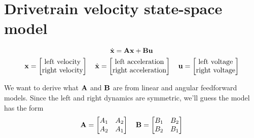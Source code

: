 \section{Drivetrain velocity state-space model}
\begin{equation*}
  \dot{\mathbf{x}} = \mathbf{A}\mathbf{x} + \mathbf{B}\mathbf{u}
\end{equation*}
\begin{equation*}
  \mathbf{x} = \begin{bmatrix}
    \text{left velocity} \\
    \text{right velocity}
  \end{bmatrix}
  \quad
  \dot{\mathbf{x}} = \begin{bmatrix}
    \text{left acceleration} \\
    \text{right acceleration}
  \end{bmatrix}
  \quad
  \mathbf{u} = \begin{bmatrix}
    \text{left voltage} \\
    \text{right voltage}
  \end{bmatrix}
\end{equation*}

We want to derive what $\mathbf{A}$ and $\mathbf{B}$ are from linear and angular
feedforward models. Since the left and right dynamics are symmetric, we'll guess
the model has the form
\begin{equation*}
  \mathbf{A} = \begin{bmatrix}
    A_1 & A_2 \\
    A_2 & A_1
  \end{bmatrix}
  \quad
  \mathbf{B} = \begin{bmatrix}
    B_1 & B_2 \\
    B_2 & B_1
  \end{bmatrix}
\end{equation*}

